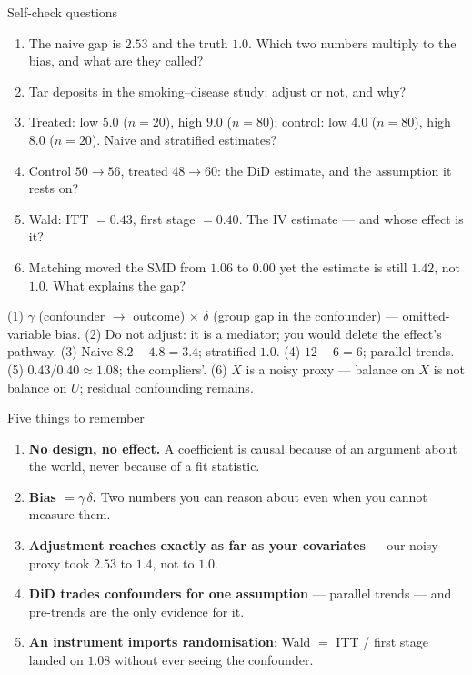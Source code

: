 \documentclass[aspectratio=169,11pt]{beamer}
\begin{document}
\begin{frame}{Self-check questions}
  \scriptsize
  \begin{readme}
    \begin{enumerate}
      \item The naive gap is $2.53$ and the truth $1.0$. Which two numbers multiply
            to the bias, and what are they called?
      \item Tar deposits in the smoking--disease study: adjust or not, and why?
      \item Treated: low $5.0$ ($n{=}20$), high $9.0$ ($n{=}80$); control: low $4.0$
            ($n{=}80$), high $8.0$ ($n{=}20$). Naive and stratified estimates?
      \item Control $50 \to 56$, treated $48 \to 60$: the DiD estimate, and the
            assumption it rests on?
      \item Wald: ITT $= 0.43$, first stage $= 0.40$. The IV estimate --- and whose
            effect is it?
      \item Matching moved the SMD from $1.06$ to $0.00$ yet the estimate is still
            $1.42$, not $1.0$. What explains the gap?
    \end{enumerate}
  \end{readme}
  \begin{takeaway}[{{Answers}}]
    (1) $\gamma$ (confounder $\to$ outcome) $\times$ $\delta$ (group gap in the
    confounder) --- omitted-variable bias. (2) Do not adjust: it is a mediator; you
    would delete the effect's pathway. (3) Naive $8.2 - 4.8 = 3.4$; stratified
    $1.0$. (4) $12 - 6 = 6$; parallel trends. (5) $0.43/0.40 \approx 1.08$; the
    compliers'. (6) $X$ is a noisy proxy --- balance on $X$ is not balance on $U$;
    residual confounding remains.
  \end{takeaway}
\end{frame}

\begin{frame}{Five things to remember}
  \begin{takeaway}
    \begin{enumerate}
      \item \textbf{No design, no effect.} A coefficient is causal because of an
            argument about the world, never because of a fit statistic.
      \item \textbf{Bias $= \gamma\,\delta$.} Two numbers you can reason about even
            when you cannot measure them.
      \item \textbf{Adjustment reaches exactly as far as your covariates} --- our
            noisy proxy took $2.53$ to $1.4$, not to $1.0$.
      \item \textbf{DiD trades confounders for one assumption} --- parallel trends
            --- and pre-trends are the only evidence for it.
      \item \textbf{An instrument imports randomisation}: Wald $= $ ITT / first
            stage landed on $1.08$ without ever seeing the confounder.
    \end{enumerate}
  \end{takeaway}
\end{frame}
\end{document}
